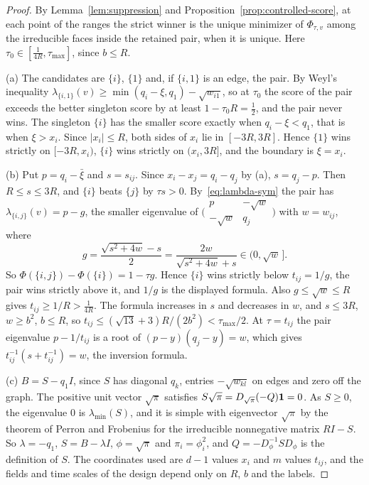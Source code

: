 \begin{proof}
By Lemma~\ref{lem:suppression} and Proposition~\ref{prop:controlled-score}, at each point of the
ranges the strict winner is the unique minimizer of $\Phi_{\tau,v}$ among the irreducible faces
inside the retained pair, when it is unique. Here $\tau_0\in[\frac1{4R},\tau_{\max}]$, since $b\le R$.

(a) The candidates are $\{i\}$, $\{1\}$ and, if $\{i,1\}$ is an edge, the pair. By Weyl's
inequality $\lambda_{\{i,1\}}(v)\ge\min(q_i-\xi,q_1)-\sqrt{w_{i1}}$, so at $\tau_0$ the score of
the pair exceeds the better singleton score by at least $1-\tau_0R=\frac12$, and the pair never
wins. The singleton $\{i\}$ has the smaller score exactly when $q_i-\xi<q_1$, that is when
$\xi>x_i$. Since $|x_i|\le R$, both sides of $x_i$ lie in $[-3R,3R]$. Hence $\{1\}$ wins strictly
on $[-3R,x_i)$, $\{i\}$ wins strictly on $(x_i,3R]$, and the boundary is $\xi=x_i$.

(b) Put $p=q_i-\bar\xi$ and $s=s_{ij}$. Since $x_i-x_j=q_i-q_j$ by (a), $s=q_j-p$. Then
$R\le s\le3R$, and $\{i\}$ beats $\{j\}$ by $\tau s>0$. By~\eqref{eq:lambda-sym} the
pair has $\lambda_{\{i,j\}}(v)=p-g$, the smaller eigenvalue of
$\bigl(\begin{smallmatrix}p&-\sqrt w\\-\sqrt w&q_j\end{smallmatrix}\bigr)$ with $w=w_{ij}$,
where
\[
 g=\frac{\sqrt{s^2+4w}-s}2=\frac{2w}{\sqrt{s^2+4w}+s}\in(0,\sqrt w\,] .
\]
So $\Phi(\{i,j\})-\Phi(\{i\})=1-\tau g$. Hence $\{i\}$ wins strictly below $t_{ij}=1/g$, the pair
wins strictly above it, and $1/g$ is the displayed formula. Also $g\le\sqrt w\le R$ gives
$t_{ij}\ge1/R>\frac1{4R}$. The formula increases in $s$ and decreases in $w$, and $s\le3R$,
$w\ge b^2$, $b\le R$, so $t_{ij}\le(\sqrt{13}+3)R/(2b^2)<\tau_{\max}/2$. At $\tau=t_{ij}$ the pair
eigenvalue $p-1/t_{ij}$ is a root of $(p-y)(q_j-y)=w$, which gives $t_{ij}^{-1}(s+t_{ij}^{-1})=w$,
the inversion formula.

(c) $B=S-q_1I$, since $S$ has diagonal $q_k$, entries $-\sqrt{w_{kl}}$ on edges and zero off the
graph. The positive unit vector $\sqrt\pi$ satisfies $S\sqrt\pi=D_{\sqrt\pi}(-Q)\mathbf{1}=0$. As
$S\ge0$, the eigenvalue $0$ is $\lambda_{\min}(S)$, and it is simple with eigenvector $\sqrt\pi$
by the theorem of Perron and Frobenius for the irreducible nonnegative matrix $RI-S$. So
$\lambda=-q_1$, $S=B-\lambda I$, $\phi=\sqrt\pi$ and $\pi_i=\phi_i^2$, and
$Q=-D_\phi^{-1}SD_\phi$ is the definition of $S$. The coordinates used are $d-1$ values $x_i$
and $m$ values $t_{ij}$, and the fields and time scales of the design depend only on $R$, $b$
and the labels.
\end{proof}

